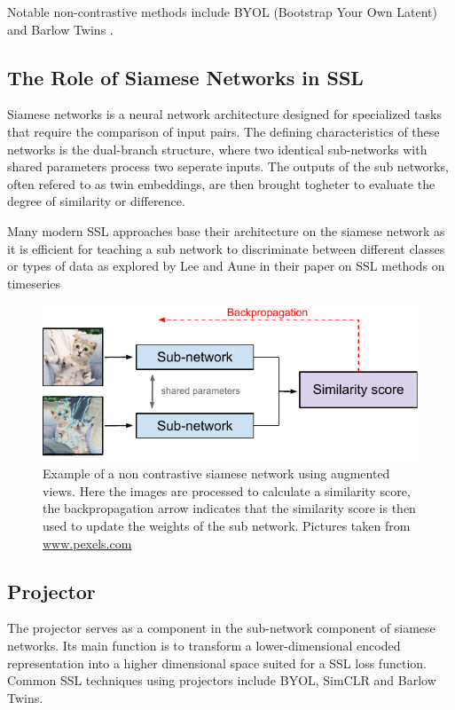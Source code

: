 Notable non-contrastive methods include BYOL (Bootstrap Your Own Latent)\cite{BYOL} and Barlow Twins \cite{Barlow}.

\subsection{The Role of Siamese Networks in SSL}
Siamese networks\cite{Siamese} is a neural network architecture designed for specialized tasks that require the comparison of input pairs. The defining characteristics of these networks is the dual-branch structure, where two identical sub-networks with shared parameters process two seperate inputs.
The outputs of the sub networks, often refered to as twin embeddings, are then brought togheter to evaluate the degree of similarity or difference.

Many modern SSL approaches base their architecture on the siamese network as it is efficient for teaching a sub network to discriminate between different classes or types of data as explored by Lee and Aune in their paper on SSL methods on timeseries \cite{SSLs}


\begin{figure}[H]
    \includegraphics[scale=1]{figures/figure-pdf/Siamese.pdf}
    \caption{ Example of a non contrastive siamese network using augmented views. Here the images are processed to calculate a similarity score, the backpropagation arrow indicates that the similarity score is then used to update the weights of the sub network. Pictures taken from \url{www.pexels.com}}
\end{figure}

\subsection{Projector}
The projector serves as a component in the sub-network component of siamese networks.
Its main function is to transform a lower-dimensional encoded representation into a higher dimensional space suited for a SSL loss function. Common SSL techniques using projectors 
include BYOL, SimCLR and Barlow Twins.


